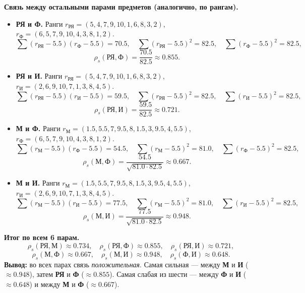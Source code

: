 \documentclass[12pt,a4paper]{article}
\begin{document}
\begin{enumerate}[label=\textbf{\arabic*.}]
\textbf{Связь между остальными парами предметов (аналогично, по рангам).}

\begin{itemize}
\item \textbf{РЯ и Ф.} Ранги $r_{\text{РЯ}}=(5,4,7,9,10,1,6,8,3,2)$, $r_{\text{Ф}}=(6,5,7,9,10,4,3,8,1,2)$.
\[
\sum (r_{\text{РЯ}}-5.5)(r_{\text{Ф}}-5.5)=70.5,\quad
\sum (r_{\text{РЯ}}-5.5)^2=82.5,\quad
\sum (r_{\text{Ф}}-5.5)^2=82.5,
\]
\[
\rho_s(\text{РЯ},\text{Ф})=\frac{70.5}{82.5}\approx 0.855.
\]
\item \textbf{РЯ и И.} Ранги $r_{\text{РЯ}}=(5,4,7,9,10,1,6,8,3,2)$, $r_{\text{И}}=(2,6,9,10,7,1,3,8,4,5)$.
\[
\sum (r_{\text{РЯ}}-5.5)(r_{\text{И}}-5.5)=59.5,\quad
\sum (r_{\text{РЯ}}-5.5)^2=82.5,\quad
\sum (r_{\text{И}}-5.5)^2=82.5,
\]
\[
\rho_s(\text{РЯ},\text{И})=\frac{59.5}{82.5}\approx 0.721.
\]
\item \textbf{М и Ф.} Ранги $r_{\text{М}}=(1.5,5.5,7,9.5,8,1.5,3,9.5,4,5.5)$, $r_{\text{Ф}}=(6,5,7,9,10,4,3,8,1,2)$.
\[
\sum (r_{\text{М}}-5.5)(r_{\text{Ф}}-5.5)=54.5,\quad
\sum (r_{\text{М}}-5.5)^2=81.0,\quad
\sum (r_{\text{Ф}}-5.5)^2=82.5,
\]
\[
\rho_s(\text{М},\text{Ф})=\frac{54.5}{\sqrt{81.0\cdot 82.5}}\approx 0.667.
\]
\item \textbf{М и И.} Ранги $r_{\text{М}}=(1.5,5.5,7,9.5,8,1.5,3,9.5,4,5.5)$, $r_{\text{И}}=(2,6,9,10,7,1,3,8,4,5)$.
\[
\sum (r_{\text{М}}-5.5)(r_{\text{И}}-5.5)=77.5,\quad
\sum (r_{\text{М}}-5.5)^2=81.0,\quad
\sum (r_{\text{И}}-5.5)^2=82.5,
\]
\[
\rho_s(\text{М},\text{И})=\frac{77.5}{\sqrt{81.0\cdot 82.5}}\approx 0.948.
\]
\end{itemize}

\textbf{Итог по всем 6 парам.}
\[
\rho_s(\text{РЯ},\text{М})\approx 0.734,\quad
\rho_s(\text{РЯ},\text{Ф})\approx 0.855,\quad
\rho_s(\text{РЯ},\text{И})\approx 0.721,
\]
\[
\rho_s(\text{М},\text{Ф})\approx 0.667,\quad
\rho_s(\text{М},\text{И})\approx 0.948,\quad
\rho_s(\text{Ф},\text{И})\approx 0.648.
\]
\textbf{Вывод:} во всех парах связь \emph{положительная}. Самая сильная — между \textbf{М} и \textbf{И} ($\approx 0.948$), затем \textbf{РЯ} и \textbf{Ф} ($\approx 0.855$). Самая слабая из шести — между \textbf{Ф} и \textbf{И} ($\approx 0.648$) и между \textbf{М} и \textbf{Ф} ($\approx 0.667$).

\end{enumerate}
\end{document}
